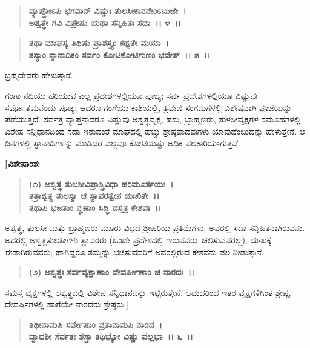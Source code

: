 \begin{verse}
\textbf{ವ್ಯಾಪ್ತೋಽಪಿ ಭಗವಾನ್ ವಿಷ್ಣುಃ ತುಲಸೀಕಾನನೇಂಽಬುಜೇ~।}\\\textbf{ಅಶ್ವತ್ಥೇ ಗವಿ ವಿಪ್ರೇಷು ಯಥಾ ಸನ್ನಿಹಿತಃ ಸದಾ~।। ೪~।।}
\end{verse}

\begin{verse}
\textbf{ತಥಾ ಮಾಘಸ್ಯ ತಿಥಿಷು ಪ್ರಾಶಸ್ತ್ಯಂ ಕಥ್ಯತೇ ಮಯಾ~।}\\\textbf{ತಸ್ಯಾಂ ಸ್ನಾನಾದಿಕಂ ಸರ್ವಂ ಕೋಟಿಕೋಟಿಗುಣಂ ಭವೇತ್~।। ೫~।।}
\end{verse}

\begin{flushleft}
ಬ್ರಹ್ಮದೇವರು ಹೇಳುತ್ತಾರೆ.-
\end{flushleft}

ಗಂಗಾ ನದಿಯು ಹರಿಯುವ ಎಲ್ಲ ಪ್ರದೇಶಗಳಲ್ಲಿಯೂ ಪೂಜ್ಯ; ಸರ್ವ ಪ್ರದೇಶಗಳಲ್ಲಿಯೂ ವಿಷ್ಣುವು ಸರ್ವೋತ್ತಮನೆಂದು ಪೂಜ್ಯ; ಆದರೂ ಗಂಗೆಯು ಕಾಶಿಯಲ್ಲಿ, ತ್ರಿವೇಣಿ ಸಂಗಮಗಳಲ್ಲಿ ವಿಶೇಷವಾಗಿ ಪೂಜೆಯನ್ನು ಪಡೆಯುತ್ತದೆ. ಸರ್ವತ್ರ ವ್ಯಾಪ್ತನಾದರೂ ವಿಷ್ಣುವು ಅಶ್ವತ್ಥವೃಕ್ಷ, ಹಸು, ಬ್ರಾಹ್ಮಣರು, ತುಳಸೀವೃಕ್ಷಗಳ ಸಮೂಹಗಳಲ್ಲಿ ವಿಶೇಷ ಸನ್ನಿಧಾನದಿಂದ ಸದಾ ಇರುವಂತೆ ಮಾಘದಲ್ಲಿ ಹೆಚ್ಚು ಶ್ರೇಷ್ಠವಾದವುಗಳು ಯಾವುದೆಂಬುದನ್ನು ಹೇಳುತ್ತೇನೆ. ಆ ದಿನಗಳಲ್ಲಿ ಸ್ನಾನಾದಿಗಳನ್ನು ಮಾಡಿದರೆ ಎಲ್ಲವೂ ಕೋಟಿಯಷ್ಟು ಅಧಿಕ ಫಲಕಾರಿಯಾಗುತ್ತವೆ.

\begin{flushleft}
\textbf{[ವಿಶೇಷಾಂಶ:}
\end{flushleft}

\begin{verse}
\textbf{(೧) ಅಶ್ವತ್ಥ ತುಲಸೀವಿಪ್ರಾಸ್ತ್ರಿವಿಧಾ ಹರಿಮೂರ್ತಯಃ~।}\\\textbf{ತತ್ರಾಶ್ವತ್ಥ ತುಲಸ್ಯಾ ಚ ಸ್ಥಾವರತ್ವೇನ ದುಃಖಿತೇ~।।}\\\textbf{ತಥಾಪಿ ಭಜತಾಂ ನೄಣಾಂ ಸಿದ್ಧಿ ದಸ್ತತ್ರ ಕೇಶವಃ~।।} 
\end{verse}

ಅಶ್ವತ್ಥ, ತುಲಸೀ ಮತ್ತು ಬ್ರಾಹ್ಮಣರು-ಮೂರು ವಿಧದ ಶ‍್ರೀಹರಿಯ ಪ್ರತಿಮೆಗಳು, ಅವರಲ್ಲಿ ಸದಾ ಸನ್ನಿಹಿತನಾಗಿರುವನು. ಅದರಲ್ಲಿ ಅಶ್ವತ್ಥತುಲಸೀಗಳು ಸ್ಥಾವರರು (ಒಂದೇ ಪ್ರದೇಶದಲ್ಲಿ ಇರುವವರು--ಚಲಿಸುವವರಲ್ಲ), ದುಃಖಕ್ಕೆ ಈಡಾಗಿರುವವರು; ಹಾಗಿದ್ದರೂ ತಮ್ಮನ್ನು ಭಜಿಸುವವರಿಗೆ ಅವರಲ್ಲಿರುವ ಕೇಶವನು ಫಲ ನೀಡುತ್ತಾನೆ.

\begin{verse}
\textbf{(೨) ಅಶ್ವತ್ಥಃ ಸರ್ವವೃಕ್ಷಾಣಾಂ ದೇವರ್ಷೀಣಾಂ ಚ ನಾರದಃ~।।} 
\end{verse}

ಸಮಸ್ತ ವೃಕ್ಷಗಳಲ್ಲಿ ಅಶ್ವತ್ಥದಲ್ಲಿ ವಿಶೇಷ ಸನ್ನಿಧಾನವನ್ನು ಇಟ್ಟಿರುತ್ತೇನೆ. ಆದುದರಿಂದ ಇತರ ವೃಕ್ಷಗಳಿಗಿಂತ ಶ್ರೇಷ್ಠ, ದೇವರ್ಷಿಗಳಲ್ಲಿ ಹಾಗೆಯೇ ನಾರದರು ಶ್ರೇಷ್ಠರು.]

\begin{verse}
\textbf{ತಿಥೀನಾಮಪಿ ಸರ್ವೇಷಾಂ ವ್ರತಾನಾಮಪಿ ನಾರದ~।}\\\textbf{ದ್ವಾದಶೀ ಸರ್ವತಃ ಶಸ್ತಾ ತಿಥಿಭ್ಯೋ ವಿಷ್ಣು ವಲ್ಲಭಾ~।। ೬~।।}
\end{verse}

